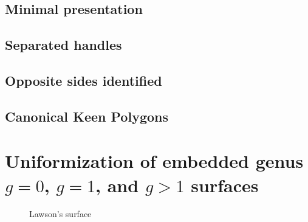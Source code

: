 \documentclass[Thesis.tex]{subfiles}
\begin{document}
\subsection{Minimal presentation}
\subsection{Separated handles}
\subsection{Opposite sides identified}
\subsection{Canonical Keen Polygons}

\section{Uniformization of embedded genus $g=0$, $g=1$, and $g>1$ surfaces}

\begin{figure}

\caption{Lawson's surface}
\end{figure}

\subfilebibliography
\end{document}
